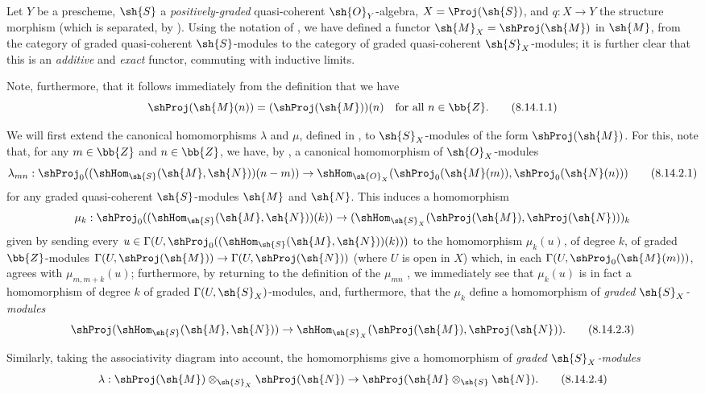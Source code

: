 \begin{env}[8.14.1]
\label{II.8.14.1}
Let $Y$ be a prescheme, $\sh{S}$ a \emph{positively-graded} quasi-coherent $\sh{O}_Y$-algebra, $X=\Proj(\sh{S})$, and $q:X\to Y$ the structure morphism (which is separated, by ).
Using the notation of , we have defined a functor $\sh{M}_X=\shProj(\sh{M})$ in $\sh{M}$, from the category of graded quasi-coherent $\sh{S}$-modules to the category of graded quasi-coherent $\sh{S}_X$-modules;
it is further clear  that this is an \emph{additive} and \emph{exact} functor, commuting with inductive limits.

Note, furthermore, that it follows immediately from the definition  that we have
\[
\label{II.8.14.1.1}
    \shProj(\sh{M}(n)) = (\shProj(\sh{M}))(n)
    \quad\mbox{for all $n\in\bb{Z}$.}
\tag{8.14.1.1}
\]
\end{env}

\begin{env}[8.14.2]
\label{II.8.14.2}
We will first extend the canonical homomorphisms $\lambda$ and $\mu$, defined in , to $\sh{S}_X$-modules of the form $\shProj(\sh{M})$.
For this, note that, for any $m\in\bb{Z}$ and $n\in\bb{Z}$, we have, by , a canonical homomorphism of $\sh{O}_X$-modules
\[
\label{II.8.14.2.1}
    \lambda_{mn}:
    \shProj_0((\shHom_{\sh{S}}(\sh{M},\sh{N}))(n-m))
    \to
    \shHom_{\sh{O}_X}(\shProj_0(\sh{M}(m)),\shProj_0(\sh{N}(n)))
\tag{8.14.2.1}
\]
for any graded quasi-coherent $\sh{S}$-modules $\sh{M}$ and $\sh{N}$.
This induces a homomorphism
\[
    \mu_k:
    \shProj_0((\shHom_{\sh{S}}(\sh{M},\sh{N}))(k))
    \to
    (\shHom_{\sh{S}_X}(\shProj(\sh{M}),\shProj(\sh{N})))_k
\]
given by sending every $u\in\Gamma(U,\shProj_0((\shHom_{\sh{S}}(\sh{M},\sh{N}))(k)))$ to the homomorphism $\mu_k(u)$, of degree $k$, of graded $\bb{Z}$-modules $\Gamma(U,\shProj(\sh{M}))\to\Gamma(U,\shProj(\sh{N}))$ (where $U$ is open in $X$) which, in each $\Gamma(U,\shProj_0(\sh{M}(m)))$, agrees with $\mu_{m,m+k}(u)$;
furthermore, by returning to the definition of the $\mu_{mn}$ , we immediately see that $\mu_k(u)$ is in fact a homomorphism of degree $k$ of graded $\Gamma(U,\sh{S}_X)$-modules, and, furthermore, that the $\mu_k$ define a homomorphism of \emph{graded $\sh{S}_X$-modules}
\[
\label{II.8.14.2.3}
    \shProj(\shHom_{\sh{S}}(\sh{M},\sh{N}))
    \to
    \shHom_{\sh{S}_X}(\shProj(\sh{M}),\shProj(\sh{N})).
\tag{8.14.2.3}
\]

Similarly, taking the associativity diagram  into account, the homomorphisms  give a homomorphism of \emph{graded $\sh{S}_X$-modules}
\[
\label{II.8.14.2.4}
    \lambda:
    \shProj(\sh{M})\otimes_{\sh{S}_X}\shProj(\sh{N})
    \to
    \shProj(\sh{M}\otimes_{\sh{S}}\sh{N}).
\tag{8.14.2.4}
\]
\end{env}

